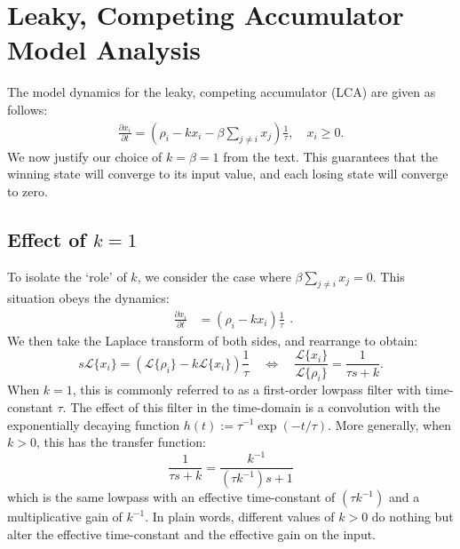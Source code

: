 \chapter{Leaky, Competing Accumulator Model Analysis}\label{sec:apdx-wta}

The model dynamics for the leaky, competing accumulator (LCA) are given as follows:
\begin{equation}
    \begin{split}
        \frac{{\partial x}_i}{\partial t} = \left(\rho_i - kx_i - \beta \sum_{j \neq i} x_j\right) \frac{1}{\tau}, \quad x_i \ge 0 .
    \end{split}
\end{equation}
We now justify our choice of $k = \beta = 1$ from the text.
This guarantees that the winning state will converge to its input value, and each losing state will converge to zero.

\section{Effect of $k = 1$}

To isolate the `role' of $k$, we consider the case where $\beta \sum_{j \ne i} x_j = 0$. 
This situation obeys the dynamics:
\begin{equation}
    \begin{split}
        \frac{{\partial x}_i}{\partial t} &= \left(\rho_i - kx_i\right) 
        \frac{1}{\tau}
    \end{split}.
\end{equation}
We then take the Laplace transform of both sides, and rearrange to obtain:
\begin{equation}
s\mathcal{L}\{x_i\} = \left( \mathcal{L}\{\rho_i\} - k\mathcal{L}\{x_i\} \right) \frac{1}{\tau} \quad \iff \quad \frac{\mathcal{L}\{x_i\}}{\mathcal{L}\{\rho_i\}} = \frac{1}{\tau s + k}.
\end{equation}
When $k = 1$, this is commonly referred to as a first-order lowpass filter with time-constant $\tau$.
The effect of this filter in the time-domain is a convolution with the exponentially decaying function $h(t) := \tau^{-1} \exp\left( -t / \tau \right)$.
More generally, when $k > 0$, this has the transfer function:
\begin{equation}
\frac{1}{\tau s + k} = \frac{k^{-1}}{(\tau k^{-1})s + 1}
\end{equation}
which is the same lowpass with an effective time-constant of $(\tau k^{-1})$ and a multiplicative gain of $k^{-1}$.
In plain words, different values of $k > 0$ do nothing but alter the effective time-constant and the effective gain on the input.

